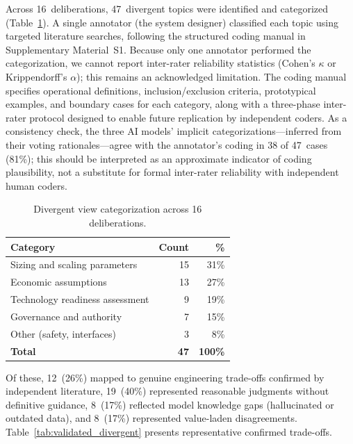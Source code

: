 \documentclass[11pt,a4paper]{article}
\begin{document}
Across 16~deliberations, 47~divergent topics were identified and categorized (Table~\ref{tab:divergent}). A single annotator (the system designer) classified each topic using targeted literature searches, following the structured coding manual in Supplementary Material~S1. Because only one annotator performed the categorization, we cannot report inter-rater reliability statistics (Cohen's $\kappa$ or Krippendorff's $\alpha$); this remains an acknowledged limitation. The coding manual specifies operational definitions, inclusion/exclusion criteria, prototypical examples, and boundary cases for each category, along with a three-phase inter-rater protocol designed to enable future replication by independent coders. As a consistency check, the three AI models' implicit categorizations---inferred from their voting rationales---agree with the annotator's coding in 38 of 47~cases (81\%); this should be interpreted as an approximate indicator of coding plausibility, not a substitute for formal inter-rater reliability with independent human coders.

\begin{table}[ht]
\centering
\caption{Divergent view categorization across 16 deliberations.}
\label{tab:divergent}
\begin{tabular}{@{}lrr@{}}
\toprule
\textbf{Category} & \textbf{Count} & \textbf{\%} \\
\midrule
Sizing and scaling parameters & 15 & 31\% \\
Economic assumptions & 13 & 27\% \\
Technology readiness assessment & 9 & 19\% \\
Governance and authority & 7 & 15\% \\
Other (safety, interfaces) & 3 & 8\% \\
\midrule
\textbf{Total} & \textbf{47} & \textbf{100\%} \\
\bottomrule
\end{tabular}
\end{table}

Of these, 12~(26\%) mapped to genuine engineering trade-offs confirmed by independent literature, 19~(40\%) represented reasonable judgments without definitive guidance, 8~(17\%) reflected model knowledge gaps (hallucinated or outdated data), and 8~(17\%) represented value-laden disagreements. Table~\ref{tab:validated_divergent} presents representative confirmed trade-offs.
\end{document}
